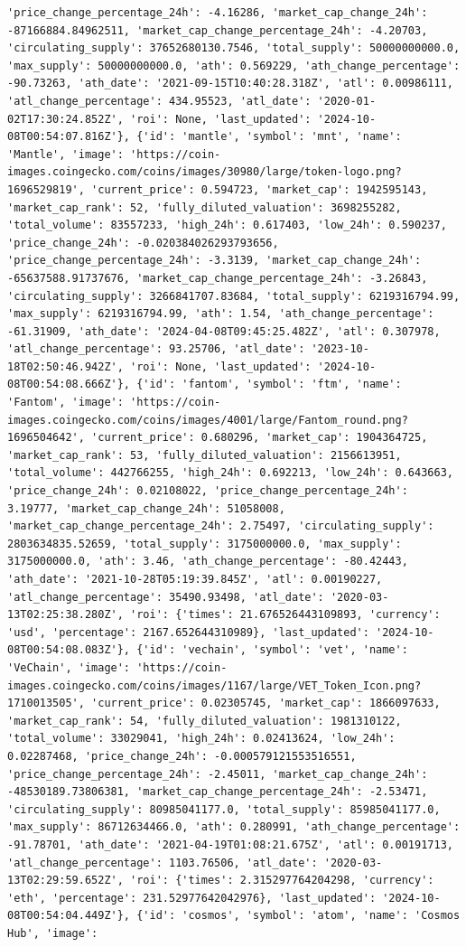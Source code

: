 \documentclass[
  letterpaper,
  DIV=11,
  numbers=noendperiod]{scrreprt}
\begin{document}
\begin{verbatim}
'price_change_percentage_24h': -4.16286, 'market_cap_change_24h': -87166884.84962511, 'market_cap_change_percentage_24h': -4.20703, 'circulating_supply': 37652680130.7546, 'total_supply': 50000000000.0, 'max_supply': 50000000000.0, 'ath': 0.569229, 'ath_change_percentage': -90.73263, 'ath_date': '2021-09-15T10:40:28.318Z', 'atl': 0.00986111, 'atl_change_percentage': 434.95523, 'atl_date': '2020-01-02T17:30:24.852Z', 'roi': None, 'last_updated': '2024-10-08T00:54:07.816Z'}, {'id': 'mantle', 'symbol': 'mnt', 'name': 'Mantle', 'image': 'https://coin-images.coingecko.com/coins/images/30980/large/token-logo.png?1696529819', 'current_price': 0.594723, 'market_cap': 1942595143, 'market_cap_rank': 52, 'fully_diluted_valuation': 3698255282, 'total_volume': 83557233, 'high_24h': 0.617403, 'low_24h': 0.590237, 'price_change_24h': -0.020384026293793656, 'price_change_percentage_24h': -3.3139, 'market_cap_change_24h': -65637588.91737676, 'market_cap_change_percentage_24h': -3.26843, 'circulating_supply': 3266841707.83684, 'total_supply': 6219316794.99, 'max_supply': 6219316794.99, 'ath': 1.54, 'ath_change_percentage': -61.31909, 'ath_date': '2024-04-08T09:45:25.482Z', 'atl': 0.307978, 'atl_change_percentage': 93.25706, 'atl_date': '2023-10-18T02:50:46.942Z', 'roi': None, 'last_updated': '2024-10-08T00:54:08.666Z'}, {'id': 'fantom', 'symbol': 'ftm', 'name': 'Fantom', 'image': 'https://coin-images.coingecko.com/coins/images/4001/large/Fantom_round.png?1696504642', 'current_price': 0.680296, 'market_cap': 1904364725, 'market_cap_rank': 53, 'fully_diluted_valuation': 2156613951, 'total_volume': 442766255, 'high_24h': 0.692213, 'low_24h': 0.643663, 'price_change_24h': 0.02108022, 'price_change_percentage_24h': 3.19777, 'market_cap_change_24h': 51058008, 'market_cap_change_percentage_24h': 2.75497, 'circulating_supply': 2803634835.52659, 'total_supply': 3175000000.0, 'max_supply': 3175000000.0, 'ath': 3.46, 'ath_change_percentage': -80.42443, 'ath_date': '2021-10-28T05:19:39.845Z', 'atl': 0.00190227, 'atl_change_percentage': 35490.93498, 'atl_date': '2020-03-13T02:25:38.280Z', 'roi': {'times': 21.676526443109893, 'currency': 'usd', 'percentage': 2167.652644310989}, 'last_updated': '2024-10-08T00:54:08.083Z'}, {'id': 'vechain', 'symbol': 'vet', 'name': 'VeChain', 'image': 'https://coin-images.coingecko.com/coins/images/1167/large/VET_Token_Icon.png?1710013505', 'current_price': 0.02305745, 'market_cap': 1866097633, 'market_cap_rank': 54, 'fully_diluted_valuation': 1981310122, 'total_volume': 33029041, 'high_24h': 0.02413624, 'low_24h': 0.02287468, 'price_change_24h': -0.000579121553516551, 'price_change_percentage_24h': -2.45011, 'market_cap_change_24h': -48530189.73806381, 'market_cap_change_percentage_24h': -2.53471, 'circulating_supply': 80985041177.0, 'total_supply': 85985041177.0, 'max_supply': 86712634466.0, 'ath': 0.280991, 'ath_change_percentage': -91.78701, 'ath_date': '2021-04-19T01:08:21.675Z', 'atl': 0.00191713, 'atl_change_percentage': 1103.76506, 'atl_date': '2020-03-13T02:29:59.652Z', 'roi': {'times': 2.315297764204298, 'currency': 'eth', 'percentage': 231.52977642042976}, 'last_updated': '2024-10-08T00:54:04.449Z'}, {'id': 'cosmos', 'symbol': 'atom', 'name': 'Cosmos Hub', 'image': 
\end{verbatim}
\end{document}
